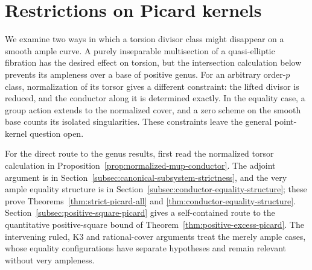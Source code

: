 \section{Restrictions on Picard kernels}
\label{sec:picard-kernel-constraints}
We examine two ways in which a torsion divisor class might disappear on a
smooth ample curve. A purely inseparable multisection of a quasi-elliptic
fibration has the desired effect on torsion, but the intersection calculation
below prevents its ampleness over a base of positive genus. For an arbitrary
order-$p$ class, normalization of its torsor gives a different constraint:
the lifted divisor is reduced, and the conductor along it is determined
exactly. In the equality case, a group action extends to the normalized
cover, and a zero scheme on the smooth base counts its isolated
singularities. These constraints leave the general point-kernel
question open.

For the direct route to the genus results, first read the normalized
torsor calculation in Proposition~\ref{prop:normalized-mup-conductor}.
The adjoint argument is in Section~\ref{subsec:canonical-subsystem-strictness},
and the very ample equality structure is in
Section~\ref{subsec:conductor-equality-structure}; these prove
Theorems~\ref{thm:strict-picard-all} and
\ref{thm:conductor-equality-structure}.
Section~\ref{subsec:positive-square-picard} gives a self-contained
route to the quantitative positive-square bound of
Theorem~\ref{thm:positive-excess-picard}.
The intervening ruled, K3 and rational-cover arguments treat the
merely ample cases, whose equality configurations have separate
hypotheses and remain relevant without very ampleness.

